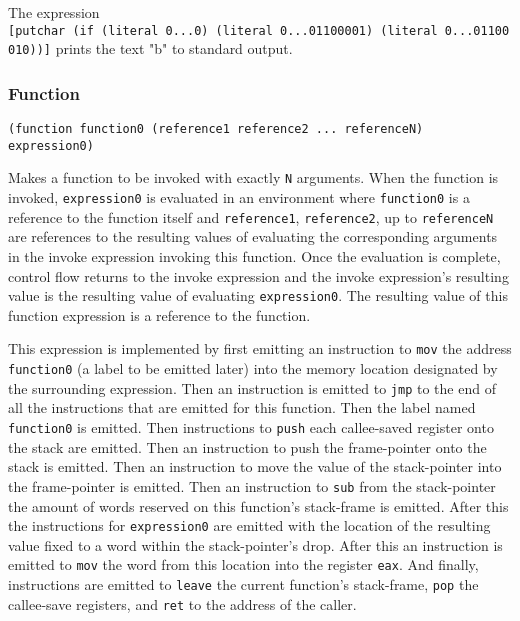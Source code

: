 \documentclass[]{article}
\begin{document}
The expression
\texttt{{[}putchar\ (if\ (literal\ 0...0)\ (literal\ 0...01100001)\ (literal\ 0...01100010)){]}}
prints the text "b" to standard output.

\hypertarget{function}{%
\subsubsection{Function}\label{function}}

\begin{verbatim}
(function function0 (reference1 reference2 ... referenceN) expression0)
\end{verbatim}

Makes a function to be invoked with exactly \texttt{N} arguments. When
the function is invoked, \texttt{expression0} is evaluated in an
environment where \texttt{function0} is a reference to the function
itself and \texttt{reference1}, \texttt{reference2}, up to
\texttt{referenceN} are references to the resulting values of evaluating
the corresponding arguments in the invoke expression invoking this
function. Once the evaluation is complete, control flow returns to the
invoke expression and the invoke expression's resulting value is the
resulting value of evaluating \texttt{expression0}. The resulting value
of this function expression is a reference to the function.

This expression is implemented by first emitting an instruction to
\texttt{mov} the address \texttt{function0} (a label to be emitted
later) into the memory location designated by the surrounding
expression. Then an instruction is emitted to \texttt{jmp} to the end of
all the instructions that are emitted for this function. Then the label
named \texttt{function0} is emitted. Then instructions to \texttt{push}
each callee-saved register onto the stack are emitted. Then an
instruction to push the frame-pointer onto the stack is emitted. Then an
instruction to move the value of the stack-pointer into the
frame-pointer is emitted. Then an instruction to \texttt{sub} from the
stack-pointer the amount of words reserved on this function's
stack-frame is emitted. After this the instructions for
\texttt{expression0} are emitted with the location of the resulting
value fixed to a word within the stack-pointer's drop. After this an
instruction is emitted to \texttt{mov} the word from this location into
the register \texttt{eax}. And finally, instructions are emitted to
\texttt{leave} the current function's stack-frame, \texttt{pop} the
callee-save registers, and \texttt{ret} to the address of the caller.
\end{document}
